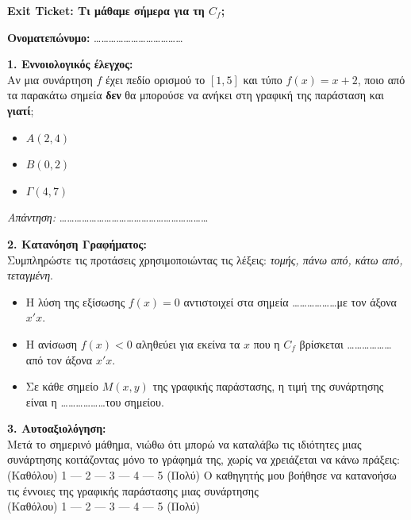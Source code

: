 \documentclass[a4paper, 12pt]{article}
\begin{document}
\newpage

\begin{center}
  \Large \textbf{Exit Ticket: Τι μάθαμε σήμερα για τη $C_f$;}
\end{center}

\vspace{0.8cm}

\textbf{Ονοματεπώνυμο:} \dots\dots\dots\dots\dots\dots\dots\dots\dots\dots\dots\dots

\vspace{0.8cm}

\textbf{1. Εννοιολογικός έλεγχος:} \\
Αν μια συνάρτηση $f$ έχει πεδίο ορισμού το $[1, 5]$ και τύπο $f(x)=x+2$, ποιο από τα παρακάτω σημεία \textbf{δεν} θα μπορούσε να ανήκει στη γραφική της παράσταση και \textbf{γιατί};
\begin{itemize}
  \item $A(2, 4)$
  \item $B(0, 2)$
  \item $\Gamma(4, 7)$
\end{itemize}
\textit{Απάντηση:} \dots\dots\dots\dots\dots\dots\dots\dots\dots\dots\dots\dots\dots\dots\dots\dots\dots\dots\dots\dots

\vspace{1cm}

\textbf{2. Κατανόηση Γραφήματος:} \\
Συμπληρώστε τις προτάσεις χρησιμοποιώντας τις λέξεις: \textit{τομής, πάνω από, κάτω από, τεταγμένη}.
\begin{itemize}
  \item Η λύση της εξίσωσης $f(x)=0$ αντιστοιχεί στα σημεία \dots\dots\dots\dots\dots\dots με τον άξονα $x'x$.
  \item Η ανίσωση $f(x) < 0$ αληθεύει για εκείνα τα $x$ που η $C_f$ βρίσκεται \dots\dots\dots\dots\dots\dots από τον άξονα $x'x$.
  \item Σε κάθε σημείο $M(x,y)$ της γραφικής παράστασης, η τιμή της συνάρτησης είναι η \dots\dots\dots\dots\dots\dots του σημείου.
\end{itemize}

\vspace{1cm}

\textbf{3. Αυτοαξιολόγηση:} \\
Μετά το σημερινό μάθημα, νιώθω ότι μπορώ να καταλάβω τις ιδιότητες μιας συνάρτησης κοιτάζοντας μόνο το γράφημά της, χωρίς να χρειάζεται να κάνω πράξεις: \\
(Καθόλου) 1 --- 2 --- 3 --- 4 --- 5 (Πολύ)
Ο καθηγητής μου βοήθησε να κατανοήσω τις έννοιες της γραφικής παράστασης μιας συνάρτησης \\
(Καθόλου) 1 --- 2 --- 3 --- 4 --- 5 (Πολύ)
\end{document}
